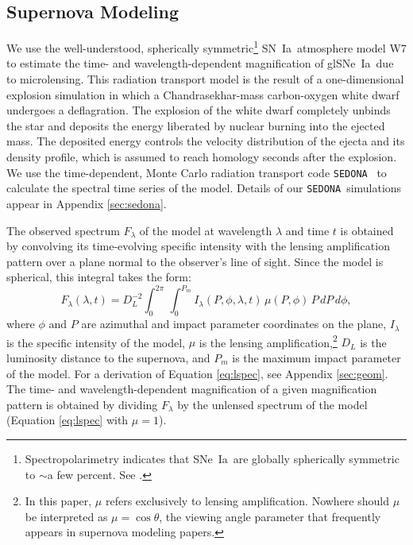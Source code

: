 \documentclass[iop,apj,numberedappendix,twocolappendix]{emulateapj}
\newcommand{\snia}{{\rm SN~Ia}}
\newcommand{\sneia}{{\rm SNe~Ia}}
\newcommand{\MCcode}{\texttt{SEDONA}}
\begin{document}
\subsection{Supernova Modeling}
\label{sec:sn}
We use the well-understood, spherically symmetric\footnote{Spectropolarimetry indicates that \sneia\ are globally spherically symmetric to $\sim$a few percent. See \cite{specpol}.} \snia\ atmosphere model W7 \citep{w7} to estimate the time- and wavelength-dependent magnification of gl\sneia\ due to microlensing.
This radiation transport model is the result of a one-dimensional explosion simulation in which a Chandrasekhar-mass carbon-oxygen white dwarf undergoes a deflagration.
The explosion of the white dwarf completely unbinds the star and deposits the energy liberated by nuclear burning into the ejected mass. 
The deposited energy controls the velocity distribution of the ejecta and its density profile, which is assumed to reach homology seconds after the explosion. 
We use the time-dependent, Monte Carlo radiation transport code \MCcode\ \citep{sedona} to calculate the spectral time series of the model.
Details of our \MCcode\ simulations appear in Appendix \ref{sec:sedona}.

The observed spectrum $F_\lambda$ of the model at wavelength $\lambda$ and time $t$ is obtained by convolving its time-evolving specific intensity with the lensing amplification pattern over a plane normal to the observer's line of sight.
Since the model is spherical, this integral takes the form:
\begin{equation}
	\label{eq:lspec}
	F_\lambda(\lambda, t) = D_L^{-2} \int_0^{2\pi}\,\int_0^{P_m} I_\lambda(P, \phi, \lambda, t)\, \mu(P, \phi)\,P\,dP\,d\phi,
\end{equation}
where $\phi$ and $P$ are azimuthal and impact parameter coordinates on the plane, $I_\lambda$ is the specific intensity of the model, $\mu$ is the lensing amplification,\footnote{In this paper, $\mu$ refers exclusively to lensing amplification. 
Nowhere should $\mu$ be interpreted as $\mu = \cos \theta$, the viewing angle parameter that frequently appears in supernova modeling papers.} $D_L$ is the luminosity distance to the supernova, and $P_m$ is the maximum impact parameter of the model.
For a derivation of Equation \ref{eq:lspec}, see Appendix \ref{sec:geom}.
The time- and wavelength-dependent magnification of a given magnification pattern is obtained by dividing $F_\lambda$ by the unlensed spectrum of the model (Equation \ref{eq:lspec} with $\mu=1$).
\end{document}
